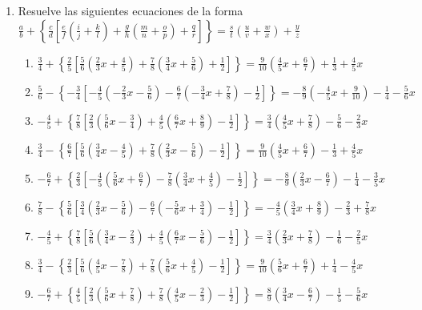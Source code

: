 \documentclass[]{book}
\begin{document}
\begin{enumerate}
\def\labelenumi{\arabic{enumi}.}
\setcounter{enumi}{3}
\item
  Resuelve las siguientes ecuaciones de la forma
  \(\frac{a}{b}+\left\{\frac{c}{d}[\frac{e}{f}(\frac{i}{j}+\frac{k}{l})+\frac{g}{h}(\frac{m}{n}+\frac{o}{p})+\frac{q}{r}] \right\}=\frac{s}{t}(\frac{u}{v}+\frac{w}{x})+\frac{y}{z}\)

  \begin{enumerate}
  \def\labelenumii{\roman{enumii}.}
  \item
    \(\frac{3}{4}+\left\{\frac{2}{5}[\frac{5}{6}(\frac{2}{3}x+\frac{4}{5})+\frac{7}{8}(\frac{3}{4}x+\frac{5}{6})+\frac{1}{2}]\right\}=\frac{9}{10}(\frac{4}{5}x+\frac{6}{7})+\frac{1}{3}+\frac{4}{5}x\)
  \item
    \(\frac{5}{6}-\left\{-\frac{3}{4}[-\frac{4}{5}(-\frac{2}{3}x-\frac{5}{6})-\frac{6}{7}(-\frac{3}{4}x+\frac{7}{8})-\frac{1}{2}]\right\}=-\frac{8}{9}(-\frac{4}{5}x+\frac{9}{10})-\frac{1}{4}-\frac{5}{6}x\)
  \item
    \(-\frac{4}{5}+\left\{\frac{7}{8}[\frac{2}{3}(\frac{5}{6}x-\frac{3}{4})+\frac{4}{5}(\frac{6}{7}x+\frac{8}{9})-\frac{1}{2}]\right\}=\frac{3}{4}(\frac{4}{5}x+\frac{7}{8})-\frac{5}{6}-\frac{2}{3}x\)
  \item
    \(\frac{3}{4}-\left\{\frac{6}{7}[\frac{5}{6}(\frac{3}{4}x-\frac{4}{5})+\frac{7}{8}(\frac{2}{3}x-\frac{5}{6})-\frac{1}{2}]\right\}=\frac{9}{10}(\frac{4}{5}x+\frac{6}{7})-\frac{1}{3}+\frac{4}{5}x\)
  \item
    \(-\frac{6}{7}+\left\{\frac{2}{3}[-\frac{4}{5}(\frac{5}{6}x+\frac{6}{7})-\frac{7}{8}(\frac{3}{4}x+\frac{4}{5})-\frac{1}{2}]\right\}=-\frac{8}{9}(\frac{2}{3}x-\frac{6}{7})-\frac{1}{4}-\frac{3}{5}x\)
  \item
    \(\frac{7}{8}-\left\{\frac{5}{6}[\frac{3}{4}(\frac{2}{3}x-\frac{5}{6})-\frac{6}{7}(-\frac{5}{6}x+\frac{3}{4})-\frac{1}{2}]\right\}=-\frac{4}{5}(\frac{3}{4}x+\frac{8}{9})-\frac{2}{3}+\frac{7}{8}x\)
  \item
    \(-\frac{4}{5}+\left\{\frac{7}{8}[\frac{5}{6}(\frac{3}{4}x-\frac{2}{3})+\frac{4}{5}(\frac{6}{7}x-\frac{5}{6})-\frac{1}{2}]\right\}=\frac{3}{4}(\frac{2}{3}x+\frac{7}{8})-\frac{1}{6}-\frac{2}{5}x\)
  \item
    \(\frac{3}{4}-\left\{\frac{2}{3}[\frac{5}{6}(\frac{4}{5}x-\frac{7}{8})+\frac{7}{8}(\frac{5}{6}x+\frac{4}{5})-\frac{1}{2}]\right\}=\frac{9}{10}(\frac{5}{6}x+\frac{6}{7})+\frac{1}{4}-\frac{4}{5}x\)
  \item
    \(-\frac{6}{7}+\left\{\frac{4}{5}[\frac{2}{3}(\frac{5}{6}x+\frac{7}{8})+\frac{7}{8}(\frac{4}{5}x-\frac{2}{3})-\frac{1}{2}]\right\}=\frac{8}{9}(\frac{3}{4}x-\frac{6}{7})-\frac{1}{5}-\frac{5}{6}x\)

\end{enumerate}
\end{enumerate}
\end{document}
